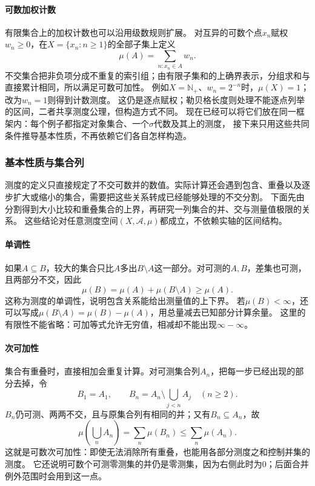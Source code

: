 \paragraph{可数加权计数}

有限集合上的加权计数也可以沿用级数规则扩展。
对互异的可数个点$x_n$赋权$w_n\geq0$，在$X=\{x_n:n\geq1\}$的全部子集上定义
\[
 \mu(A)=\sum_{n:x_n\in A}w_n.
\]
不交集合把非负项分成不重复的索引组；由有限子集和的上确界表示，分组求和与直接累计相同，所以满足可数可加性。
例如$X=\mathbb N_+$、$w_n=2^{-n}$时，$\mu(X)=1$；改为$w_n=1$则得到计数测度。
这仍是逐点赋权；勒贝格长度则处理不能逐点列举的区间，二者共享测度公理，但构造方式不同。
现在已经可以将它们放在同一框架内：每个例子都指定对象集合、一个$\sigma$代数及其上的测度，
接下来只用这些共同条件推导基本性质，不再依赖它们各自怎样构造。

\subsubsection{基本性质与集合列}
\label{sec:comb-set-approximation}
\label{sec:analysis-set-measure-continuity}

测度的定义只直接规定了不交可数并的数值。实际计算还会遇到包含、重叠以及逐步扩大或缩小的集合，需要把这些关系转成已经能够处理的不交分割。
下面先由分割得到大小比较和重叠集合的上界，再研究一列集合的并、交与测量值极限的关系。
这些结论对任意测度空间$(X,\mathcal A,\mu)$都成立，不依赖实轴的区间结构。

\paragraph{单调性}

如果$A\subseteq B$，较大的集合只比$A$多出$B\setminus A$这一部分。对可测的$A,B$，差集也可测，且两部分不交，因此
\[
 \mu(B)=\mu(A)+\mu(B\setminus A)\geq\mu(A).
\]
这称为测度的单调性，说明包含关系能给出测量值的上下界。
若$\mu(B)<\infty$，还可以写成$\mu(B\setminus A)=\mu(B)-\mu(A)$，用总量减去已知部分计算余量。
这里的有限性不能省略：可加等式允许无穷值，相减却不能出现$\infty-\infty$。

\paragraph{次可加性}

集合有重叠时，直接相加会重复计算。对可测集合列$A_n$，把每一步已经出现的部分去掉，令
\[
 B_1=A_1,\qquad B_n=A_n\setminus\bigcup_{j<n}A_j\quad(n\geq2).
\]
$B_n$仍可测、两两不交，且与原集合列有相同的并；又有$B_n\subseteq A_n$，故
\[
 \mu\left(\bigcup_nA_n\right)=\sum_n\mu(B_n)\leq\sum_n\mu(A_n).
\]
这就是可数次可加性：即使无法消除所有重叠，也能用各部分测度之和控制并集的测度。
它还说明可数个可测零测集的并仍是零测集，因为右侧此时为$0$；后面合并例外范围时会用到这一点。

